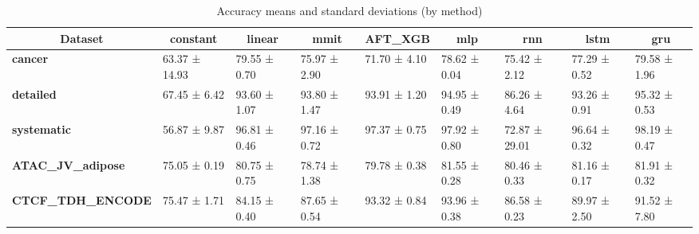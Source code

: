 \documentclass[12pt]{article}
\begin{document}
\begin{table}
\scriptsize
\caption{Accuracy means and standard deviations (by method)} 
\begin{tabular}{|lllllllll|}
\hline
\multicolumn{1}{|c}{\textbf{Dataset}} & \multicolumn{1}{c}{\textbf{constant}} & \multicolumn{1}{c}{\textbf{linear}} & \multicolumn{1}{c}{\textbf{mmit}} & \multicolumn{1}{c}{\textbf{AFT\_XGB}} & \multicolumn{1}{c}{\textbf{mlp}}   & \multicolumn{1}{c}{\textbf{rnn}}   & \multicolumn{1}{c}{\textbf{lstm}}  & \multicolumn{1}{c|}{\textbf{gru}}   \\ \hline
\textbf{cancer}                        & 63.37 ± 14.93                          & 79.55 ± 0.70                         & 75.97 ± 2.90                       & 71.70 ± 4.10                               & 78.62 ± 0.04                        & 75.42 ± 2.12                        & 77.29 ± 0.52                        & {\color[HTML]{FE0000} 79.58 ± 1.96} \\ \hline
\textbf{detailed}                      & 67.45 ± 6.42                           & 93.60 ± 1.07                         & 93.80 ± 1.47                       & 93.91 ± 1.20                               & 94.95 ± 0.49                        & 86.26 ± 4.64                        & 93.26 ± 0.91                        & {\color[HTML]{CB0000} 95.32 ± 0.53} \\ \hline
\textbf{systematic}                    & 56.87 ± 9.87                           & 96.81 ± 0.46                         & 97.16 ± 0.72                       & 97.37 ± 0.75                               & 97.92 ± 0.80                        & 72.87 ± 29.01                       & 96.64 ± 0.32                        & {\color[HTML]{CB0000} 98.19 ± 0.47} \\ \hline
\textbf{ATAC\_JV\_adipose}             & 75.05 ± 0.19                           & 80.75 ± 0.75                         & 78.74 ± 1.38                       & 79.78 ± 0.38                               & 81.55 ± 0.28                        & 80.46 ± 0.33                        & 81.16 ± 0.17                        & {\color[HTML]{CB0000} 81.91 ± 0.32} \\ \hline
\textbf{CTCF\_TDH\_ENCODE}             & 75.47 ± 1.71                           & 84.15 ± 0.40                         & 87.65 ± 0.54                       & 93.32 ± 0.84                               & {\color[HTML]{CB0000} 93.96 ± 0.38} & 86.58 ± 0.23                        & 89.97 ± 2.50                        & 91.52 ± 7.80                        \\ \hline

\end{tabular}
\end{table}
\end{document}
